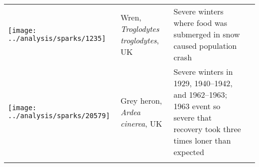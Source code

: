 \begin{small}
\begin{longtable}{>{\RaggedRight}m{2.0cm}>{\RaggedRight}p{3.0cm}>{\RaggedRight}p{7.0cm}>{\RaggedRight}p{2.0cm}}
\texttt{[image: ../analysis/sparks/1235]} &
Wren,
\textit{Troglodytes troglodytes},
UK &
Severe winters where food was submerged in snow caused population crash &
\citep{newton1998} \\

\texttt{[image: ../analysis/sparks/20579]} &
Grey heron,
\textit{Ardea cinerea},
UK &
Severe winters in 1929, 1940--1942, and 1962--1963; 1963 event so severe that
recovery took three times loner than expected &
\citep{stafford1971} \\





\bottomrule
\label{tab:sparks}
\end{longtable}
\end{small}

